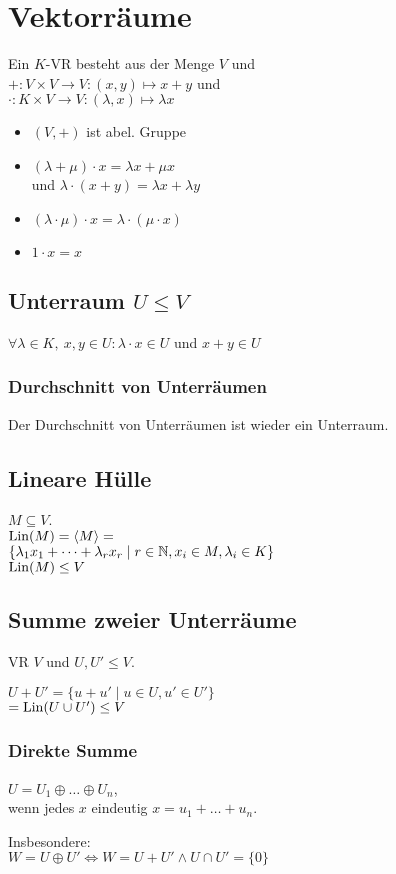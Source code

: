 \section*{Vektorräume}

Ein $K$-VR besteht aus der Menge $V$ und \\
$+: V\times V \to V : (x,y) \mapsto x + y$ und \\
$\cdot : K \times V \to V: (\lambda, x) \mapsto \lambda x$
\begin{itemize}
	\item $(V,+)$ ist abel. Gruppe
	\item $(\lambda + \mu)\cdot x = \lambda x + \mu x$ \\
		und $\lambda\cdot(x+y) = \lambda x + \lambda y$
	\item $(\lambda \cdot \mu)\cdot x = \lambda \cdot (\mu \cdot x)$
	\item $1\cdot x = x$
\end{itemize}

\subsection*{Unterraum $U \le V$}
$\forall \lambda \in K,~ x,y \in U: \lambda\cdot x\in U$ und $x+y\in U$

\subsubsection*{Durchschnitt von Unterräumen}
Der Durchschnitt von Unterräumen ist wieder ein Unterraum.

\subsection*{Lineare Hülle}
$M\subseteq V$. \\
$\operatorname{Lin}(M)=\langle M \rangle = $\\
$\{\lambda_1 x_1 + \dots + \lambda_r x_r \mid r\in\mathbb{N}, x_i \in M, \lambda_i \in K\}$ \\
$\operatorname{Lin}(M)\le V $

\subsection*{Summe zweier Unterräume}
VR $V$ und $U,U' \le V$.

$U + U' = \{u + u' \mid u\in U, u' \in U'\}$ \\
$= \operatorname{Lin}(U\cup U') \le V$

\subsubsection*{Direkte Summe}
$U = U_1 \oplus \dots \oplus U_n$, \\
wenn jedes $x$ eindeutig $x = u_1 + \dots + u_n$.

Insbesondere: \\
$W = U \oplus U' \Leftrightarrow W = U + U' \land U\cap U' = \{0\}$
